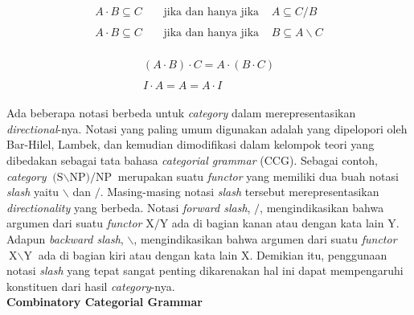\begin{align}
  \begin{split}\label{catg:syn:4}
    A \cdot B \subseteq C & \;\;\;\;\text{jika dan hanya jika}\;\;\;\; A \subseteq C/B
  \end{split}\\
  \begin{split}\label{catg:syn:5}
    A \cdot B \subseteq C & \;\;\;\;\text{jika dan hanya jika}\;\;\;\; B \subseteq A\backslash{}C
  \end{split}
\end{align}

\begin{align}
  \begin{split}\label{catg:syn:6}
    (A \cdot B) \cdot C = A \cdot (B \cdot C)
  \end{split}\\
  \begin{split}\label{catg:syn:7}
    I \cdot A = A = A \cdot I
  \end{split}
\end{align}

Ada beberapa notasi berbeda untuk \textit{category} dalam merepresentasikan \textit{directional}-nya.
Notasi yang paling umum digunakan adalah  yang dipelopori oleh Bar-Hilel,
Lambek, dan kemudian dimodifikasi dalam kelompok teori yang dibedakan sebagai tata bahasa
 \textit{categorial grammar} (CCG).
Sebagai contoh, \textit{category} $\text{(S$\backslash$NP)/NP}$ merupakan suatu \textit{functor} yang
memiliki dua buah notasi \textit{slash} yaitu $\backslash$ dan $/$.
Masing-masing notasi \textit{slash} tersebut merepresentasikan \textit{directionality} yang berbeda.
Notasi \textit{forward slash}, $/$, mengindikasikan bahwa argumen dari suatu \textit{functor}
$\text{X}/\text{Y}$ ada di bagian kanan atau dengan kata lain $\text{Y}$.
Adapun \textit{backward slash}, $\backslash$, mengindikasikan bahwa argumen dari suatu \textit{functor}
$\text{X}\backslash\text{Y}$ ada di bagian kiri atau dengan kata lain $\text{X}$.
Demikian itu, penggunaan notasi \textit{slash} yang tepat sangat penting dikarenakan hal ini dapat
mempengaruhi konstituen dari hasil  \textit{category}-nya.
\\


\noindent\textbf{Combinatory Categorial Grammar}\label{kajian-ccg}

